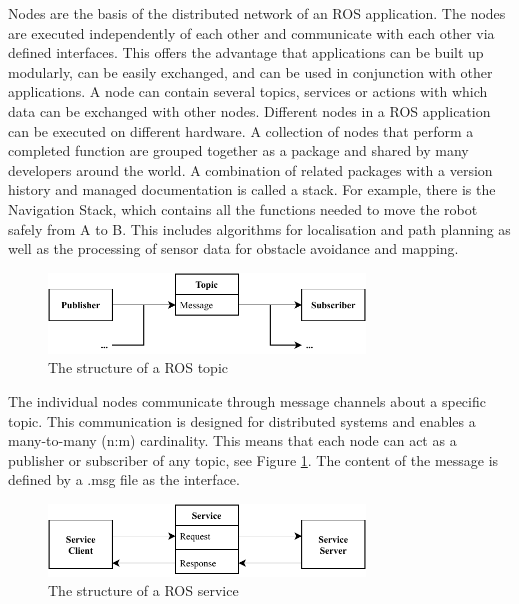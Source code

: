Nodes are the basis of the distributed network of an ROS application. The nodes are executed independently of each other and communicate with each other via defined interfaces. This offers the advantage that applications can be built up modularly, can be easily exchanged, and can be used in conjunction with other applications. A node can contain several topics, services or actions with which data can be exchanged with other nodes. Different nodes in a ROS application can be executed on different hardware. A collection of nodes that perform a completed function are grouped together as a package and shared by many developers around the world. A combination of related packages with a version history and managed documentation is called a stack. For example, there is the Navigation Stack, which contains all the functions needed to move the robot safely from A to B. This includes algorithms for localisation and path planning as well as the processing of sensor data for obstacle avoidance and mapping.

\begin{figure}[h]
    \centering
    \includegraphics[width=0.75\textwidth]{figures/02_state_of_the_art/topics.pdf}
    \caption{The structure of a ROS topic}
    \label{fig:topics}
\end{figure}

The individual nodes communicate through message channels about a specific topic. This communication is designed for distributed systems and enables a many-to-many (n:m) cardinality. This means that each node can act as a publisher or subscriber of any topic, see Figure \ref{fig:topics}. The content of the message is defined by a .msg file as the interface.

\begin{figure}[h]
    \centering
    \includegraphics[width=0.75\textwidth]{figures/02_state_of_the_art/services.pdf}
    \caption{The structure of a ROS service}
    \label{fig:services}
\end{figure}

